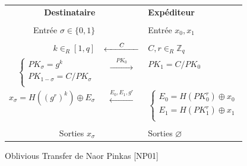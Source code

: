 \documentclass{article}
\begin{document}
\begin{figure}[h]
\centering
\begin{small}
\begin{tabular}{|rcl|}
\hline
\textbf{Destinataire} & & \textbf{Expéditeur}\\
 & & \\
Entrée $\sigma \in \{0,1\}$ & & Entrée $x_0, x_1$ \\
 & & \\
$k \in _R [1,q]$ & $\xleftarrow{\hspace{1.5em} C \hspace{1.5em}}$ & $C,r \in _R \mathbb{Z}_q$\\
$\begin{cases} PK_{\sigma} = g^k \\ PK_{1-\sigma} = C/PK_{\sigma} \\ \end{cases}$ & $\xrightarrow{\hspace{1em} PK_0 \hspace{1em}}$ & $PK_1 = C / PK_0$  \\
$x_{\sigma} = H((g^r)^k) \oplus E_{\sigma}$ & $\xleftarrow{E_0, E_1, g^r}$ & $\begin{cases} E_0 = H(PK_0^r) \oplus x_0 \\ E_1 = H(PK_1^r) \oplus x_1 \\ \end{cases}$ \hspace{-1.5em} \\
 & & \\
Sorties $x_{\sigma}$ & & Sorties $\varnothing$ \\
\hline
\end{tabular}
\end{small}
\captionsetup{labelformat=empty}
\caption{Oblivious Transfer de Naor Pinkas [NP01]}
\end{figure}
\end{document}
